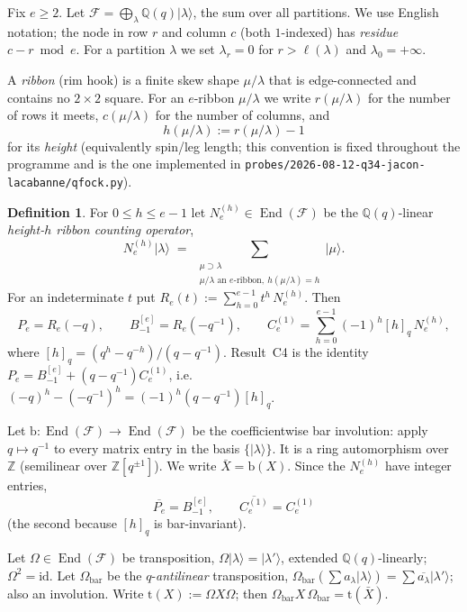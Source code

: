 \documentclass[11pt]{article}
\theoremstyle{plain}
\theoremstyle{definition}
\newtheorem{definition}[theorem]{Definition}
\DeclareMathOperator{\End}{End}
\newcommand{\F}{\mathcal{F}}
\newcommand{\Om}{\Omega}
\newcommand{\Ombar}{\Om_{\mathrm{bar}}}
\newcommand{\qq}{(q-q^{-1})}
\newcommand{\Bm}{B_{-1}^{[e]}}
\newcommand{\Ce}{C_e^{(1)}}
\newcommand{\N}[1]{N_e^{(#1)}}
\begin{document}
Fix $e\ge2$.  Let $\F=\bigoplus_{\lambda}\mathbb{Q}(q)\lvert\lambda\rangle$,
the sum over all partitions.  We use English notation; the node in row $r$ and
column $c$ (both $1$-indexed) has \emph{residue} $c-r \bmod e$.  For a
partition $\lambda$ we set $\lambda_r=0$ for $r>\ell(\lambda)$ and
$\lambda_0=+\infty$.

A \emph{ribbon} (rim hook) is a finite skew shape $\mu/\lambda$ that is
edge-connected and contains no $2\times2$ square.  For an $e$-ribbon
$\mu/\lambda$ we write $r(\mu/\lambda)$ for the number of rows it meets,
$c(\mu/\lambda)$ for the number of columns, and
\[
  h(\mu/\lambda) := r(\mu/\lambda)-1
\]
for its \emph{height} (equivalently spin/leg length; this convention is fixed
throughout the programme and is the one implemented in
\texttt{probes/2026-08-12-q34-jacon-lacabanne/qfock.py}).

\begin{definition}\label{def:ops}
For $0\le h\le e-1$ let $\N{h}\in\End(\F)$ be the $\mathbb{Q}(q)$-linear
\emph{height-$h$ ribbon counting operator},
\[
  \N{h}\lvert\lambda\rangle
   \;=\; \sum_{\substack{\mu\supset\lambda \\ \mu/\lambda \text{ an $e$-ribbon},\ h(\mu/\lambda)=h}}
          \lvert\mu\rangle .
\]
For an indeterminate $t$ put $R_e(t):=\sum_{h=0}^{e-1}t^h\,\N{h}$.  Then
\[
  P_e = R_e(-q),\qquad \Bm = R_e(-q^{-1}),\qquad
  \Ce=\sum_{h=0}^{e-1}(-1)^h[h]_q\,\N{h},
\]
where $[h]_q=(q^h-q^{-h})/(q-q^{-1})$.  Result~C4 is the identity
$P_e=\Bm+\qq\Ce$, i.e.\ $(-q)^h-(-q^{-1})^h=(-1)^h\qq[h]_q$.
\end{definition}

Let $\mathrm{b}\colon\End(\F)\to\End(\F)$ be the coefficientwise bar
involution: apply $q\mapsto q^{-1}$ to every matrix entry in the basis
$\{\lvert\lambda\rangle\}$.  It is a ring automorphism over $\mathbb{Z}$
(semilinear over $\mathbb{Z}[q^{\pm1}]$).  We write $\bar X=\mathrm{b}(X)$.
Since the $\N{h}$ have integer entries,
\begin{equation}\label{eq:barP}
  \overline{P_e}=\Bm,\qquad \overline{\Ce}=\Ce
\end{equation}
(the second because $[h]_q$ is bar-invariant).

Let $\Om\in\End(\F)$ be transposition, $\Om\lvert\lambda\rangle=
\lvert\lambda'\rangle$, extended $\mathbb{Q}(q)$-linearly; $\Om^2=\mathrm{id}$.
Let $\Ombar$ be the $q$-\emph{antilinear} transposition,
$\Ombar(\sum a_\lambda\lvert\lambda\rangle)=\sum\overline{a_\lambda}
\lvert\lambda'\rangle$; also an involution.  Write
$\mathrm{t}(X):=\Om X\Om$; then $\Ombar X\,\Ombar=\mathrm{t}(\bar X)$.
\end{document}

